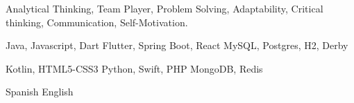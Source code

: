 
\begin{cvparagraph}
Analytical Thinking, Team Player, Problem Solving, Adaptability, Critical thinking, Communication, Self-Motivation.
\end{cvparagraph}

\begin{multicols}{3}
  \begin{cvskills}
    \cvskill
      {Java, Javascript, Dart} %
      {\faStar\faStar\faStar\faStar\faStarHalfEmpty} %
    \cvskill
      {Flutter, Spring Boot, React} %
      {\faStar\faStar\faStar\faStar\faStarHalfEmpty} %
    \cvskill
      {MySQL, Postgres, H2, Derby} %
      {\faStar\faStar\faStar\faStar\faStarHalfEmpty} %
  \end{cvskills}

  \columnbreak

  \begin{cvskills}
    \cvskill
      {Kotlin, HTML5-CSS3} %
      {\faStar\faStar\faStar\faStarHalfEmpty\faStarO} %
    \cvskill
      {{\hphantom{Empty}} Python, Swift, PHP} %
      {\faStar\faStar\faStar\faStarHalfEmpty\faStarO} %
    \cvskill
      {MongoDB, Redis} %
      {\faStar\faStar\faStar\faStarHalfEmpty\faStarO} %
  \end{cvskills}

  \columnbreak

  \begin{cvskills}
    \cvskill
      {Spanish} %
      {\faStar\faStar\faStar\faStar\faStar} %
    \cvskill
      {English} %
      {\faStar\faStar\faStar\faStarHalfEmpty\faStarO} %
  \end{cvskills}
\end{multicols}

